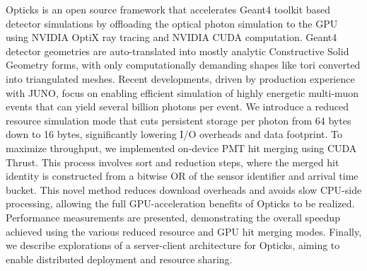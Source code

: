Opticks is an open source framework that accelerates Geant4 toolkit based
detector simulations by offloading the optical photon simulation to the GPU
using NVIDIA OptiX ray tracing and NVIDIA CUDA computation. Geant4 detector
geometries are auto-translated into mostly analytic Constructive Solid Geometry
forms, with only computationally demanding shapes like tori converted into
triangulated meshes.%
%
Recent developments, driven by production experience with JUNO, focus on
enabling efficient simulation of highly energetic multi-muon events 
that can yield several billion photons per event. We introduce a reduced resource
simulation mode that cuts persistent storage per photon from 64 bytes down to
16 bytes, significantly lowering I/O overheads and data footprint.%
%
To maximize throughput, we implemented on-device PMT hit merging using CUDA
Thrust. This process involves sort and reduction steps, where the merged hit
identity is constructed from a bitwise OR of the sensor identifier and arrival
time bucket. This novel method reduces download overheads and avoids slow
CPU-side processing, allowing the full GPU-acceleration benefits of Opticks to
be realized.%
%
Performance measurements are presented, demonstrating the overall speedup
achieved using the various reduced resource and GPU hit merging modes. Finally,
we describe explorations of a server-client architecture for Opticks, aiming to
enable distributed deployment and resource sharing.%
%
